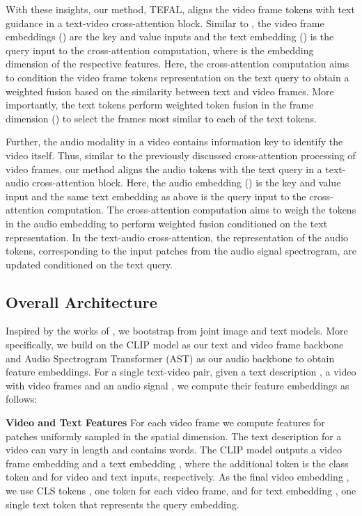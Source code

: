 \documentclass[10pt,twocolumn,letterpaper]{article}
\begin{document}
With these insights, our method, TEFAL, aligns the video frame tokens with text guidance in a text-video cross-attention block. Similar to \cite{gorti2022xpool}, the video frame embeddings () are the key and value inputs and the text embedding () is the query input to the cross-attention computation, where  is the embedding dimension of the respective features. Here, the cross-attention computation aims to condition the video frame tokens representation on the text query to obtain a weighted fusion based on the similarity between text and video frames. More importantly, the text tokens perform weighted token fusion in the frame dimension () to select the frames most similar to each of the text tokens.  


Further, the audio modality in a video contains information key to identify the video itself. Thus, similar to the previously discussed cross-attention processing of video frames, our method aligns the audio tokens with the text query in a text-audio cross-attention block. Here, the audio embedding () is the key and value input and the same text embedding as above is the query input to the cross-attention computation. The cross-attention computation aims to weigh the tokens in the audio embedding to perform weighted fusion conditioned on the text representation. In the text-audio cross-attention, the representation of the audio tokens, corresponding to the input patches from the audio signal spectrogram, are updated conditioned on the text query.


\subsection{Overall Architecture}
\label{subsec:method_overall_architecture}
Inspired by the works of \cite{gorti2022xpool, Luo2022CLIP4ClipAE}, we bootstrap from joint image and text models. More specifically, we build on the CLIP \cite{clip} model as our text and video frame backbone and Audio Spectrogram Transformer (AST) \cite{gong21b_interspeech} as our audio backbone to obtain feature embeddings. For a single text-video pair, given a text description , a video  with  video frames and an audio signal , we compute their feature embeddings as follows:

\noindent \textbf{Video and Text Features} For each video frame  we compute features for  patches uniformly sampled in the spatial dimension. The text description for a video can vary in length and contains  words. The CLIP model outputs a video frame embedding  and a text embedding , where the additional token is the class token  and  for video and text inputs, respectively. As the final video embedding , we use  CLS tokens , one token for each video frame, and for text embedding , one single text token  that represents the query embedding.
\end{document}
